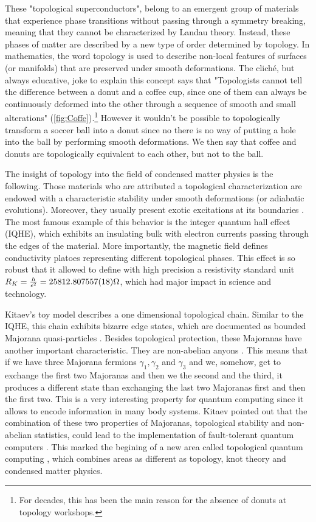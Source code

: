 These "topological superconductors", belong to an emergent group of materials that experience phase transitions without passing through a symmetry breaking, meaning that they cannot be characterized by Landau theory. Instead, these phases of matter are described by  a new type of  order determined by topology. In mathematics, the word topology is used to describe non-local features of surfaces (or manifolds) that are preserved under smooth deformations. The clich\'e, but always educative, joke to explain this concept says that "Topologists cannot tell the difference between a donut and a coffee cup, since one of them 
can always be continuously deformed into the other through a
sequence of smooth and small alterations" (\ref{fig:Coffe}).\footnote{For decades, this has been the main reason for the absence of donuts at topology workshops.} However it wouldn't be possible to topologically transform a soccer ball into  a donut since no there is no way of putting  a hole into the ball by performing smooth deformations. We then say that coffee and donuts are topologically equivalent to each other, but not to the ball. 



The insight of topology into  the field of condensed matter physics is the following. Those materials who are attributed a topological characterization are endowed with a characteristic stability under smooth deformations (or adiabatic evolutions). Moreover, they usually present exotic excitations at its boundaries . The most famous example of this behavior is the integer quantum hall effect (IQHE), which exhibits an insulating bulk with electron currents passing through the edges of the material. More importantly, the magnetic field defines conductivity platoes representing different topological phases. This effect is so robust that it allowed to define with high precision a resistivity standard unit $ R_K =\frac{h}{\epsilon^2} = 25812.807557(18) \Omega$, which had major impact in science and technology. 


Kitaev's toy model describes a one dimensional  topological chain. Similar to the IQHE, this chain exhibits bizarre edge states, which are documented as bounded Majorana quasi-particles . Besides topological protection, these Majoranas have another important characteristic. They are non-abelian anyons \citep{kitaev_fault-tolerant_2003}. This means that if we have three Majorana fermions $\gamma_1 ,\gamma_2 $ and $\gamma_3$ and we, somehow, get to exchange the first two Majoranas and then we  the second and the third, it produces a different state than exchanging the last two Majoranas first and then the first two. This is a very interesting property for quantum computing since it allows to encode information in many body systems.  Kitaev pointed out that the combination of these two properties of Majoranas, topological stability and non-abelian statistics, could lead  to the implementation of fault-tolerant quantum computers . This marked the begining of a new area called  topological quantum computing \cite{pachos_introduction_2012}, which combines areas as different as topology, knot theory \cite{turaev_book} and condensed matter physics. 

